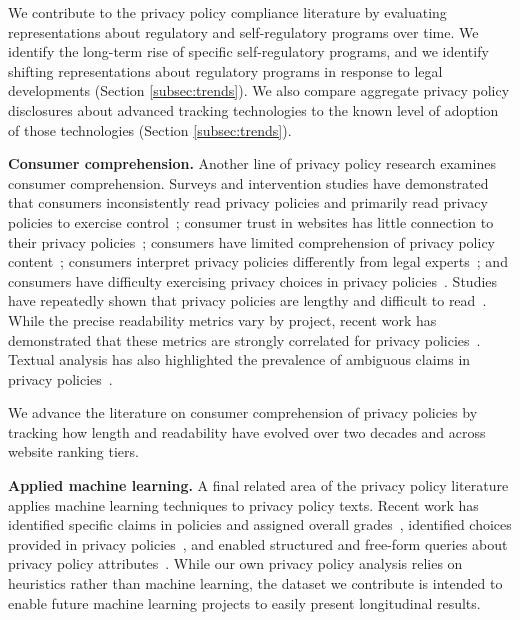 We contribute to the privacy policy compliance literature by evaluating representations about regulatory and self-regulatory programs over time. We identify the long-term rise of specific self-regulatory programs,
 and we identify shifting representations about regulatory programs in response to legal developments
(Section \ref{subsec:trends}). We also compare aggregate privacy policy disclosures about advanced tracking technologies to the known level of adoption of those technologies (Section \ref{subsec:trends}).

\textbf{Consumer comprehension.}
Another line of privacy policy research examines consumer comprehension. Surveys and intervention studies have demonstrated that consumers inconsistently read privacy policies and primarily read privacy policies to exercise control~\cite{milne2004}; consumer trust in websites has little connection to their privacy policies~\cite{pan2006}; consumers have limited comprehension of privacy policy content~\cite{vail2008, mcdonald2009comparative}; consumers interpret privacy policies differently from legal experts~\cite{reidenberg2016disagreeable, strahilevitz2016}; and consumers have difficulty exercising privacy choices in privacy policies~\cite{habib2020}. Studies have repeatedly shown that privacy policies are lengthy and difficult to read~\cite{jensen2004, mcdonald2008cost, li2012online, fabian2017large}. While the precise readability metrics vary by project, recent work has demonstrated that these metrics are strongly correlated for privacy policies~\cite{fabian2017large}. Textual analysis has also highlighted the prevalence of ambiguous claims in privacy policies~\cite{reidenberg2016ambiguity}.

We advance the literature on consumer comprehension of privacy policies by tracking how length and readability have evolved over two decades and across website ranking tiers.

\textbf{Applied machine learning.}
A final related area of the privacy policy literature applies machine learning techniques to 
privacy policy texts. Recent work has identified specific claims in policies and assigned overall grades~\cite{zimmeck2014}, identified choices provided in privacy policies~\cite{sathyendra2017, kumar2020}, and enabled structured and free-form queries about privacy policy attributes~\cite{harkous2018polisis}. While our own privacy policy analysis relies on heuristics rather than  machine learning, the dataset we contribute is intended to enable future machine learning projects to easily present longitudinal results.